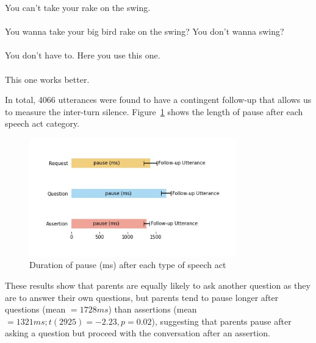 \bxl
You can’t take your rake on the swing.\\
  \\ 
 You wanna take your big bird rake on the swing? 			\hfill {}
\ex You don't wanna swing?\\
  \\	
 You don’t have to.	\hfill {}
\ex Here you use this one. \\
  \\ This one works better.	\hfill {}
\exl
\eex

In total, 4066 utterances were found to have a contingent follow-up that allows us to measure the inter-turn silence. Figure~\ref{fig:engsp:pause} shows the length of pause after each speech act category.

\begin{figure}[H]
\begin{center}
\includegraphics[width = 0.8\textwidth]{figures/pause.jpg}
	\caption{Duration of pause (ms) after each type of speech act}\label{fig:engsp:pause}
\end{center}
\end{figure}

These results show that parents are equally likely to ask another question as they are to answer their own questions, but parents tend to pause longer after questions (mean $= 1728ms$) than assertions (mean $= 1321ms; t(2925) = -2.23, p = 0.02$), suggesting that parents pause after asking a question but proceed with the conversation after an assertion. %

